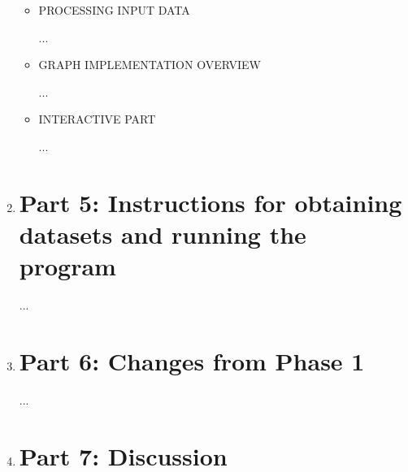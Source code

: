 \documentclass[12pt]{article}
\begin{document}
\begin{enumerate}
\begin{text}
\begin{itemize}
    \item PROCESSING INPUT DATA
    
    ...
    \item GRAPH IMPLEMENTATION OVERVIEW
    
    ...
    \item INTERACTIVE PART
    
    ...
\end{itemize}

\end{text}

\newpage

\item \section*{Part 5: Instructions for obtaining datasets and running the program}

\begin{text}

...

\end{text}



\newpage

\item \section*{Part 6: Changes from Phase 1}

\begin{text}

...

\end{text}

\newpage

\item \section*{Part 7: Discussion}

\begin{text}



\end{text}
\end{enumerate}
\end{document}
